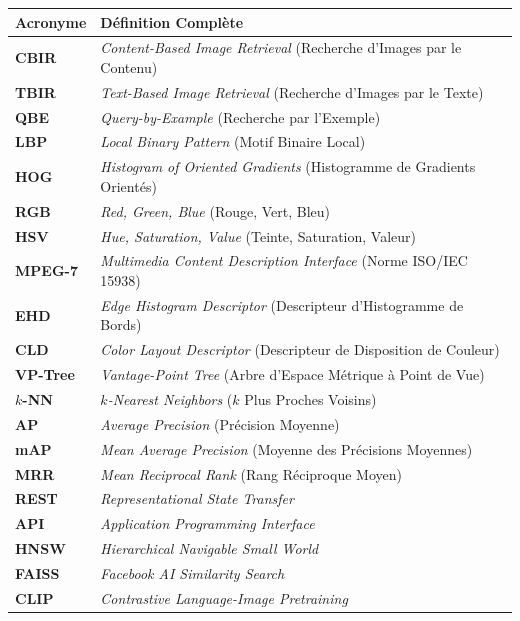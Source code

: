 \documentclass[11pt,a4paper,oneside]{report}
\theoremstyle{definition}
\begin{document}
\begin{table}[H]
\centering\small
\begin{tabular}{ll}
\toprule
\textbf{Acronyme} & \textbf{Définition Complète} \\
\midrule
\textbf{CBIR}   & \textit{Content-Based Image Retrieval} (Recherche d'Images par le Contenu) \\
\textbf{TBIR}   & \textit{Text-Based Image Retrieval} (Recherche d'Images par le Texte) \\
\textbf{QBE}    & \textit{Query-by-Example} (Recherche par l'Exemple) \\
\textbf{LBP}    & \textit{Local Binary Pattern} (Motif Binaire Local) \\
\textbf{HOG}    & \textit{Histogram of Oriented Gradients} (Histogramme de Gradients Orientés) \\
\textbf{RGB}    & \textit{Red, Green, Blue} (Rouge, Vert, Bleu) \\
\textbf{HSV}    & \textit{Hue, Saturation, Value} (Teinte, Saturation, Valeur) \\
\textbf{MPEG-7} & \textit{Multimedia Content Description Interface} (Norme ISO/IEC 15938) \\
\textbf{EHD}    & \textit{Edge Histogram Descriptor} (Descripteur d'Histogramme de Bords) \\
\textbf{CLD}    & \textit{Color Layout Descriptor} (Descripteur de Disposition de Couleur) \\
\textbf{VP-Tree}& \textit{Vantage-Point Tree} (Arbre d'Espace Métrique à Point de Vue) \\
\textbf{$k$-NN} & \textit{$k$-Nearest Neighbors} ($k$ Plus Proches Voisins) \\
\textbf{AP}     & \textit{Average Precision} (Précision Moyenne) \\
\textbf{mAP}    & \textit{Mean Average Precision} (Moyenne des Précisions Moyennes) \\
\textbf{MRR}    & \textit{Mean Reciprocal Rank} (Rang Réciproque Moyen) \\
\textbf{REST}   & \textit{Representational State Transfer} \\
\textbf{API}    & \textit{Application Programming Interface} \\
\textbf{HNSW}   & \textit{Hierarchical Navigable Small World} \\
\textbf{FAISS}  & \textit{Facebook AI Similarity Search} \\
\textbf{CLIP}   & \textit{Contrastive Language-Image Pretraining} \\
\bottomrule
\end{tabular}
\end{table}
\end{document}
